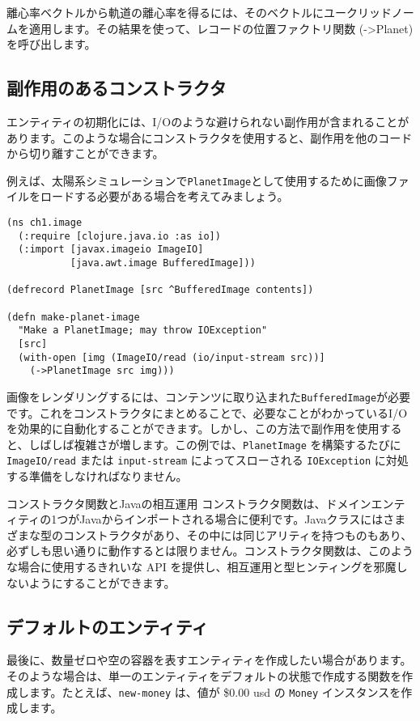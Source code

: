 離心率ベクトルから軌道の離心率を得るには、そのベクトルにユークリッドノームを適用します。その結果を使って、レコードの位置ファクトリ関数 (->Planet) を呼び出します。

\subsection{副作用のあるコンストラクタ}

エンティティの初期化には、I/Oのような避けられない副作用が含まれることがあります。このような場合にコンストラクタを使用すると、副作用を他のコードから切り離すことができます。

例えば、太陽系シミュレーションで\texttt{PlanetImage}として使用するために画像ファイルをロードする必要がある場合を考えてみましょう。


\begin{lstlisting}[numbers=none]
(ns ch1.image
  (:require [clojure.java.io :as io])
  (:import [javax.imageio ImageIO]
           [java.awt.image BufferedImage]))

(defrecord PlanetImage [src ^BufferedImage contents])

(defn make-planet-image
  "Make a PlanetImage; may throw IOException"
  [src]
  (with-open [img (ImageIO/read (io/input-stream src))]
    (->PlanetImage src img)))
\end{lstlisting}

画像をレンダリングするには、コンテンツに取り込まれた\texttt{BufferedImage}が必要です。これをコンストラクタにまとめることで、必要なことがわかっているI/Oを効果的に自動化することができます。しかし、この方法で副作用を使用すると、しばしば複雑さが増します。この例では、\texttt{PlanetImage} を構築するたびに \texttt{ImageIO/read} または \texttt{input-stream} によってスローされる \texttt{IOException} に対処する準備をしなければなりません。

\begin{itembox}[l]{コンストラクタ関数とJavaの相互運用}
コンストラクタ関数は、ドメインエンティティの1つがJavaからインポートされる場合に便利です。Javaクラスにはさまざまな型のコンストラクタがあり、その中には同じアリティを持つものもあり、必ずしも思い通りに動作するとは限りません。コンストラクタ関数は、このような場合に使用するきれいな API を提供し、相互運用と型ヒンティングを邪魔しないようにすることができます。
\end{itembox}

\subsection{デフォルトのエンティティ}

最後に、数量ゼロや空の容器を表すエンティティを作成したい場合があります。そのような場合は、単一のエンティティをデフォルトの状態で作成する関数を作成します。たとえば、\texttt{new-money} は、値が \$0.00 usd の \texttt{Money} インスタンスを作成します。





\begin{lstlisting}[numbers=none]

\end{lstlisting}









